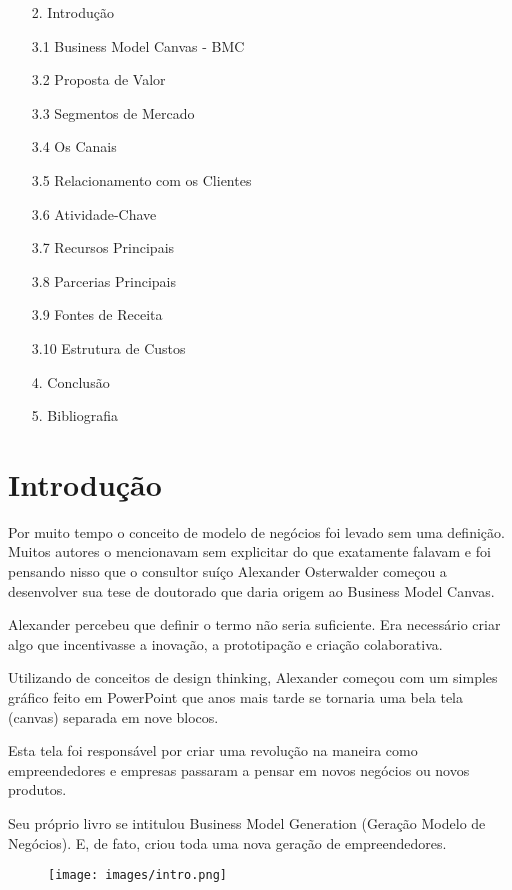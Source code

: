 \documentclass[a4paper]{article}
\begin{document}
\begin{itemize}
    \item[2.] Introdução 
    \item[3.1] Business Model Canvas - BMC 
    \item[3.2] Proposta de Valor 
    \item[3.3] Segmentos de Mercado 
    \item[3.4] Os Canais 
    \item[3.5] Relacionamento com os Clientes 
    \item[3.6] Atividade-Chave 
    \item[3.7] Recursos Principais 
    \item[3.8] Parcerias Principais 
    \item[3.9] Fontes de Receita 
    \item[3.10] Estrutura de Custos 
    \item[4.] Conclusão 
    \item[5.] Bibliografia 
\end{itemize}
\vfill
\pagebreak
\section{Introdução}
\par Por muito tempo o conceito de modelo de negócios foi levado sem uma definição. Muitos autores o mencionavam sem explicitar do que exatamente falavam e foi pensando nisso que o consultor suíço Alexander Osterwalder começou a desenvolver sua tese de doutorado que daria origem ao Business Model Canvas.
\par Alexander percebeu que definir o termo não seria suficiente. Era necessário criar algo que incentivasse a inovação, a prototipação e criação colaborativa.
\par Utilizando de conceitos de design thinking, Alexander começou com um simples gráfico feito em PowerPoint que anos mais tarde se tornaria uma bela tela (canvas) separada em nove blocos.
\par Esta tela foi responsável por criar uma revolução na maneira como empreendedores e empresas passaram a pensar em novos negócios ou novos produtos.
\par Seu próprio livro se intitulou Business Model Generation (Geração Modelo de Negócios). E, de fato, criou toda uma nova geração de empreendedores.
\begin{figure}[h]
    \texttt{[image: images/intro.png]}
\end{figure}
\vfill
\pagebreak
\end{document}
